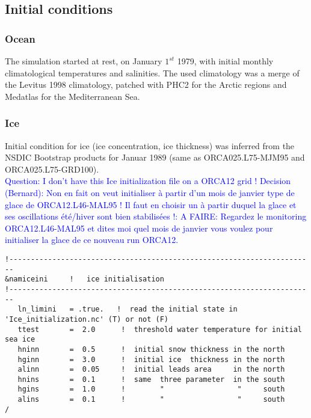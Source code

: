 \subsection{Initial conditions}

\subsubsection{Ocean}

The simulation started at rest, on January $1^{st}$ 1979, with initial monthly climatological temperatures and salinities. 
The used climatology was a merge of the Levitus 1998 climatology, patched with PHC2 for the Arctic regions and Medatlas for the Mediterranean Sea.

\subsubsection{Ice}

Initial condition for ice (ice concentration, ice thickness) was inferred from the NSDIC Bootstrap products for Januar 1989 (same as ORCA025.L75-MJM95 and ORCA025.L75-GRD100).\\

\textcolor{blue}{Question: I don't have this Ice initialization file on a ORCA12 grid ! Decision (Bernard): Non en fait on veut initialiser \`a partir d'un mois de janvier type de glace de ORCA12.L46-MAL95 ! 
Il faut en choisir un \`a partir duquel la glace et ses oscillations \'et\'e/hiver sont bien stabilis\'ees !: A FAIRE: Regardez le monitoring ORCA12.L46-MAL95 et dites moi quel 
mois de janvier vous voulez pour initialiser la glace de ce nouveau run ORCA12.}

\scriptsize
\begin{verbatim}
!-----------------------------------------------------------------------
&namiceini     !   ice initialisation
!-----------------------------------------------------------------------
   ln_limini   = .true.   !  read the initial state in 'Ice_initialization.nc' (T) or not (F)
   ttest       =  2.0      !  threshold water temperature for initial sea ice
   hninn       =  0.5      !  initial snow thickness in the north
   hginn       =  3.0      !  initial ice  thickness in the north
   alinn       =  0.05     !  initial leads area     in the north
   hnins       =  0.1      !  same  three parameter  in the south
   hgins       =  1.0      !        "                 "     south
   alins       =  0.1      !        "                 "     south
/
\end{verbatim}

